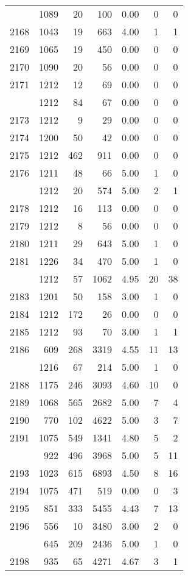 \documentclass[
]{article}
\begin{document}
\begin{table}
\begin{tabular}[t]{lrrrrrr}
\addlinespace
2167 & 1089 & 20 & 100 & 0.00 & 0 & 0\\
2168 & 1043 & 19 & 663 & 4.00 & 1 & 1\\
2169 & 1065 & 19 & 450 & 0.00 & 0 & 0\\
2170 & 1090 & 20 & 56 & 0.00 & 0 & 0\\
2171 & 1212 & 12 & 69 & 0.00 & 0 & 0\\
\addlinespace
2172 & 1212 & 84 & 67 & 0.00 & 0 & 0\\
2173 & 1212 & 9 & 29 & 0.00 & 0 & 0\\
2174 & 1200 & 50 & 42 & 0.00 & 0 & 0\\
2175 & 1212 & 462 & 911 & 0.00 & 0 & 0\\
2176 & 1211 & 48 & 66 & 5.00 & 1 & 0\\
\addlinespace
2177 & 1212 & 20 & 574 & 5.00 & 2 & 1\\
2178 & 1212 & 16 & 113 & 0.00 & 0 & 0\\
2179 & 1212 & 8 & 56 & 0.00 & 0 & 0\\
2180 & 1211 & 29 & 643 & 5.00 & 1 & 0\\
2181 & 1226 & 34 & 470 & 5.00 & 1 & 0\\
\addlinespace
2182 & 1212 & 57 & 1062 & 4.95 & 20 & 38\\
2183 & 1201 & 50 & 158 & 3.00 & 1 & 0\\
2184 & 1212 & 172 & 26 & 0.00 & 0 & 0\\
2185 & 1212 & 93 & 70 & 3.00 & 1 & 1\\
2186 & 609 & 268 & 3319 & 4.55 & 11 & 13\\
\addlinespace
2187 & 1216 & 67 & 214 & 5.00 & 1 & 0\\
2188 & 1175 & 246 & 3093 & 4.60 & 10 & 0\\
2189 & 1068 & 565 & 2682 & 5.00 & 7 & 4\\
2190 & 770 & 102 & 4622 & 5.00 & 3 & 7\\
2191 & 1075 & 549 & 1341 & 4.80 & 5 & 2\\
\addlinespace
2192 & 922 & 496 & 3968 & 5.00 & 5 & 11\\
2193 & 1023 & 615 & 6893 & 4.50 & 8 & 16\\
2194 & 1075 & 471 & 519 & 0.00 & 0 & 3\\
2195 & 851 & 333 & 5455 & 4.43 & 7 & 13\\
2196 & 556 & 10 & 3480 & 3.00 & 2 & 0\\
\addlinespace
2197 & 645 & 209 & 2436 & 5.00 & 1 & 0\\
2198 & 935 & 65 & 4271 & 4.67 & 3 & 1\\

\end{tabular}
\end{table}
\end{document}
